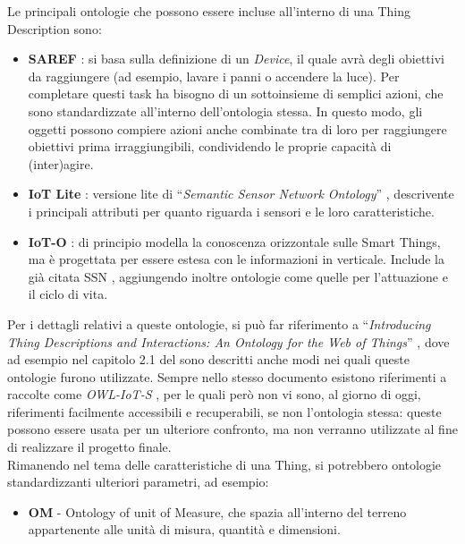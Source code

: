 \documentclass[12pt,a4paper,openright,oneside]{report}
\newcommand{\quotes}[1]{``#1''}
\begin{document}
Le principali ontologie che possono essere incluse all'interno di una Thing Description sono:
\begin{itemize}
	\item \textbf{SAREF} \cite{saref}: si basa sulla definizione di un \textit{Device}, il quale avrà degli obiettivi da raggiungere (ad esempio, lavare i panni o accendere la luce). Per completare questi task ha bisogno di un sottoinsieme di semplici azioni, che sono standardizzate all'interno dell'ontologia stessa. In questo modo, gli oggetti possono compiere azioni anche combinate tra di loro per raggiungere obiettivi prima irraggiungibili, condividendo le proprie capacità di (inter)agire.
	
	\item \textbf{IoT Lite} \cite{iot-lite}: versione lite di \quotes{\textit{Semantic Sensor Network Ontology}} \cite{ssno}, descrivente i principali attributi per quanto riguarda i sensori e le loro caratteristiche.
	
	\item \textbf{IoT-O} \cite{ioto}\cite{iot-paper}: di principio modella la conoscenza orizzontale sulle Smart Things, ma è progettata per essere estesa con le informazioni in verticale. Include la già citata SSN \cite{ssno}, aggiungendo inoltre ontologie come quelle per l'attuazione e il ciclo di vita.

\end{itemize}

Per i dettagli relativi a queste ontologie, si può far riferimento a  \quotes{\textit{Introducing Thing Descriptions and Interactions: An Ontology for the Web of Things}} \cite{td-paper2}, dove ad esempio nel capitolo 2.1 del sono descritti anche modi nei quali queste ontologie furono utilizzate. Sempre nello stesso documento esistono riferimenti a raccolte come \textit{OWL-IoT-S} \cite{owliot}, per le quali però non vi sono, al giorno di oggi, riferimenti facilmente accessibili e recuperabili, se non l'ontologia stessa: queste possono essere usata per un ulteriore confronto, ma non verranno utilizzate al fine di realizzare il progetto finale.\\

Rimanendo nel tema delle caratteristiche di una Thing, si potrebbero ontologie standardizzanti ulteriori parametri, ad esempio:
\begin{itemize}
	\item \textbf{OM} - Ontology of unit of Measure, che spazia all'interno del terreno appartenente alle unità di misura, quantità e dimensioni.
\end{itemize}
\end{document}

